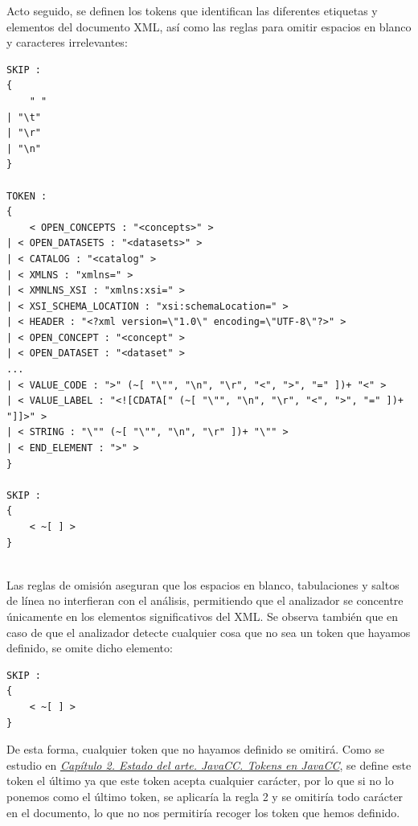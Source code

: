Acto seguido, se definen los tokens que identifican las diferentes etiquetas y elementos del documento XML, así como las reglas para omitir espacios en blanco y caracteres irrelevantes:

\lstset{inputencoding=utf8/latin1}
\begin{lstlisting}
SKIP :
{
    " "
| "\t"
| "\r"
| "\n"
}

TOKEN :
{
    < OPEN_CONCEPTS : "<concepts>" >
| < OPEN_DATASETS : "<datasets>" >
| < CATALOG : "<catalog" >
| < XMLNS : "xmlns=" >
| < XMNLNS_XSI : "xmlns:xsi=" >
| < XSI_SCHEMA_LOCATION : "xsi:schemaLocation=" >
| < HEADER : "<?xml version=\"1.0\" encoding=\"UTF-8\"?>" >
| < OPEN_CONCEPT : "<concept" >
| < OPEN_DATASET : "<dataset" >
...
| < VALUE_CODE : ">" (~[ "\"", "\n", "\r", "<", ">", "=" ])+ "<" >
| < VALUE_LABEL : "<![CDATA[" (~[ "\"", "\n", "\r", "<", ">", "=" ])+ "]]>" >
| < STRING : "\"" (~[ "\"", "\n", "\r" ])+ "\"" >
| < END_ELEMENT : ">" >
}

SKIP :
{
    < ~[ ] >
}
    
\end{lstlisting}

Las reglas de omisión aseguran que los espacios en blanco, tabulaciones y saltos de línea no interfieran con el análisis, permitiendo que el analizador se concentre únicamente en los elementos significativos del XML. Se observa también que en caso de que el analizador detecte cualquier cosa que no sea un token que hayamos definido, se omite dicho elemento:

\lstset{inputencoding=utf8/latin1}
\begin{lstlisting}
SKIP :
{
    < ~[ ] >
}
\end{lstlisting}

De esta forma, cualquier token que no hayamos definido se omitirá. Como se estudio en \hyperref[sec:tokensenjavacc]{\textit{Capítulo 2. Estado del arte. JavaCC. Tokens en JavaCC}}, se define este token el último ya que este token acepta cualquier carácter, por lo que si no lo ponemos como el último token, se aplicaría la regla 2 y se omitiría todo carácter en el documento, lo que no nos permitiría recoger los token que hemos definido.


